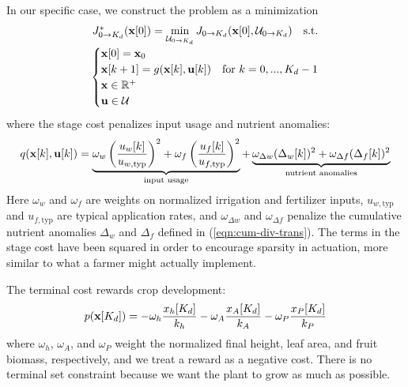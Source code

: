 \documentclass[pdflatex,sn-mathphys-num]{sn-jnl}
\newcommand{\df}[2]{\displaystyle\frac{#1}{#2}}
\begin{document}
In our specific case, we construct the problem as a minimization
\begin{equation}
\begin{array}{c}
J_{0\to K_{d}}^{*}({\bf x}[0]) = \min\limits_{\mathcal{U}_{0\to K_{d}}} J_{0\to K_{d}}({\bf x}[0], \mathcal{U}_{0\to K_{d}}) \quad \text{s.t.} \\[7pt]
\begin{cases}
{\bf x}[0] = {\bf x}_{0} \\
{\bf x}[k+1] = g({\bf x}[k], {\bf u}[k]) & \text{for } k=0,...,K_{d}-1 \\
{\bf x}\in\mathbb{R}^{+} \\
{\bf u}\in{\mathcal{U}}
\end{cases}
\end{array}
\label{eqn:minimization-cftoc}
\end{equation}
where the stage cost penalizes input usage and nutrient anomalies:
\begin{equation}
q({\bf x}[k], {\bf u}[k]) =
\underbrace{\omega_{w}\left( \df{u_{w}[k]}{u_{w,\text{typ}}} \right)^{2} +
\omega_{f}\left( \df{u_{f}[k]}{u_{f,\text{typ}}} \right)^{2}}_{\text{input usage}} +
\underbrace{\omega_{\Delta w}(\Delta_{w}[k])^{2} +
\omega_{\Delta f}(\Delta_{f}[k])^{2}}_{\text{nutrient anomalies}}
\label{eqn:stage-cost}
\end{equation}
Here $\omega_w$ and $\omega_f$ are weights on normalized irrigation and fertilizer inputs, $u_{w,\text{typ}}$ and $u_{f,\text{typ}}$ are typical application rates, and $\omega_{\Delta w}$ and $\omega_{\Delta f}$ penalize the cumulative nutrient anomalies $\Delta_w$ and $\Delta_f$ defined in (\ref{eqn:cum-div-trans}). The terms in the stage cost have been squared in order to encourage sparsity in actuation, more similar to what a farmer might actually implement.

The terminal cost rewards crop development:
\begin{equation}
p({\bf x}[K_{d}]) =
-\omega_{h}\df{x_{h}[K_{d}]}{k_{h}} -
\omega_{A}\df{x_{A}[K_{d}]}{k_{A}} -
\omega_{P}\df{x_{P}[K_{d}]}{k_{P}}
\label{eqn:terminal-cost}
\end{equation}
where $\omega_h$, $\omega_A$, and $\omega_P$ weight the normalized final height, leaf area, and fruit biomass, respectively, and we treat a reward as a negative cost. There is no terminal set constraint because we want the plant to grow as much as possible.

\end{document}
